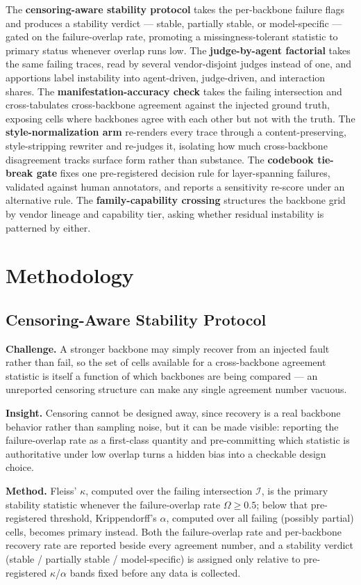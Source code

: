 \documentclass[11pt]{article}
\begin{document}
The \textbf{censoring-aware stability protocol} takes the per-backbone failure flags and produces a stability verdict --- stable, partially stable, or model-specific --- gated on the failure-overlap rate, promoting a missingness-tolerant statistic to primary status whenever overlap runs low. The \textbf{judge-by-agent factorial} takes the same failing traces, read by several vendor-disjoint judges instead of one, and apportions label instability into agent-driven, judge-driven, and interaction shares. The \textbf{manifestation-accuracy check} takes the failing intersection and cross-tabulates cross-backbone agreement against the injected ground truth, exposing cells where backbones agree with each other but not with the truth. The \textbf{style-normalization arm} re-renders every trace through a content-preserving, style-stripping rewriter and re-judges it, isolating how much cross-backbone disagreement tracks surface form rather than substance. The \textbf{codebook tie-break gate} fixes one pre-registered decision rule for layer-spanning failures, validated against human annotators, and reports a sensitivity re-score under an alternative rule. The \textbf{family-capability crossing} structures the backbone grid by vendor lineage and capability tier, asking whether residual instability is patterned by either.

\section{Methodology}

\subsection{Censoring-Aware Stability Protocol}
\textbf{Challenge.} A stronger backbone may simply recover from an injected fault rather than fail, so the set of cells available for a cross-backbone agreement statistic is itself a function of which backbones are being compared --- an unreported censoring structure can make any single agreement number vacuous.

\textbf{Insight.} Censoring cannot be designed away, since recovery is a real backbone behavior rather than sampling noise, but it can be made visible: reporting the failure-overlap rate as a first-class quantity and pre-committing which statistic is authoritative under low overlap turns a hidden bias into a checkable design choice.

\textbf{Method.} Fleiss' $\kappa$, computed over the failing intersection $\mathcal{I}$, is the primary stability statistic whenever the failure-overlap rate $\Omega \geq 0.5$; below that pre-registered threshold, Krippendorff's $\alpha$, computed over all failing (possibly partial) cells, becomes primary instead. Both the failure-overlap rate and per-backbone recovery rate are reported beside every agreement number, and a stability verdict (stable / partially stable / model-specific) is assigned only relative to pre-registered $\kappa$/$\alpha$ bands fixed before any data is collected.
\end{document}
